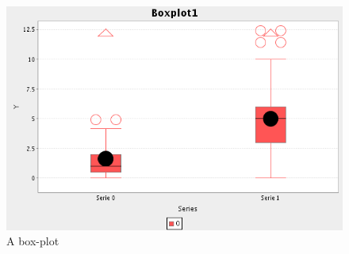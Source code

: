 \begin{latexonly}
\begin{figure}
\begin{center}
\includegraphics[scale=0.5]{exam/BoxTest.png}
\caption{A box-plot\label{fig:boxchart-res}}
\end{center}
\end{figure}

\end{latexonly}
